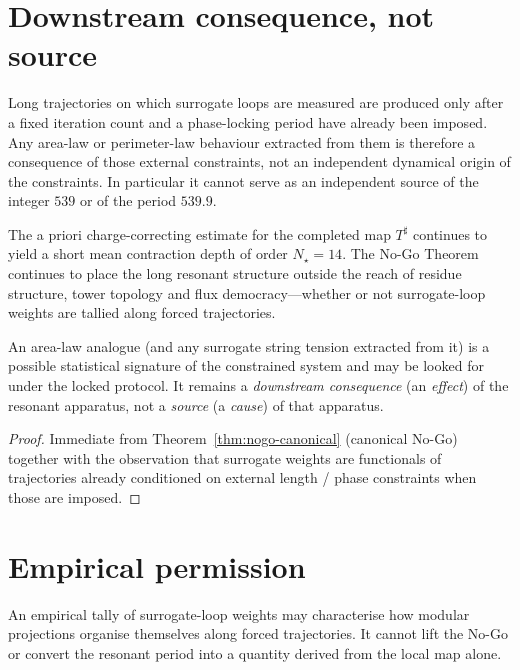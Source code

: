\section{Downstream consequence, not source}

\begin{theorem}
\label{thm:surrogate-nogo}
Long trajectories on which surrogate loops are measured are produced only after
a fixed iteration count and a phase-locking period have already been imposed.
Any area-law or perimeter-law behaviour extracted from them is therefore a
consequence of those external constraints, not an independent dynamical origin
of the constraints. In particular it cannot serve as an independent source of
the integer \(539\) or of the period \(539.9\).

The a priori charge-correcting estimate for the completed map \(T^\sharp\)
continues to yield a short mean contraction depth of order \(N_\star=14\). The
No-Go Theorem continues to place the long resonant structure outside the reach
of residue structure, tower topology and flux democracy---whether or not
surrogate-loop weights are tallied along forced trajectories.

An area-law analogue (and any surrogate string tension extracted from it) is a
possible statistical signature of the constrained system and may be looked for
under the locked protocol. It remains a \emph{downstream consequence} (an
\emph{effect}) of the resonant apparatus, not a \emph{source} (a \emph{cause})
of that apparatus.
\end{theorem}

\begin{proof}
Immediate from Theorem~\ref{thm:nogo-canonical} (canonical No-Go) together with
the observation that surrogate weights are functionals of trajectories already
conditioned on external length / phase constraints when those are imposed.
\end{proof}

\section{Empirical permission}

\begin{corollary}
An empirical tally of surrogate-loop weights may characterise how modular
projections organise themselves along forced trajectories. It cannot lift the
No-Go or convert the resonant period into a quantity derived from the local map
alone.
\end{corollary}

